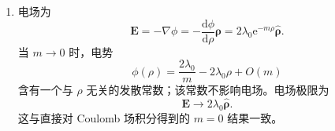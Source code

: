 \begin{question}[Proca 场]
\begin{solution}
\begin{enumerate}
  \item 电场为
  \[
    \mathbf E=-\nabla\phi=-\frac{\mathrm d\phi}{\mathrm d\rho}\hat{\boldsymbol\rho}
    =\boxed{2\lambda_0\mathrm e^{-m\rho}\hat{\boldsymbol\rho}} .
  \]
  当 $m\to0$ 时，电势
  \[
    \phi(\rho)=\frac{2\lambda_0}{m}-2\lambda_0\rho+O(m)
  \]
  含有一个与 $\rho$ 无关的发散常数；该常数不影响电场。电场极限为
  \[
    \mathbf E\to2\lambda_0\hat{\boldsymbol\rho} .
  \]
  这与直接对 Coulomb 场积分得到的 $m=0$ 结果一致。
\end{enumerate}
\end{solution}
\end{question}

